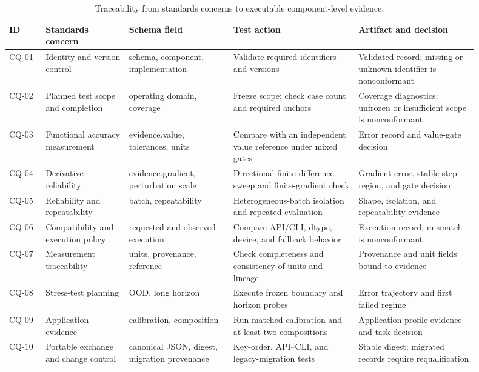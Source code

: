 \documentclass[preprint,12pt]{elsarticle}
\begin{document}
\begin{table}[htbp]
\centering
\caption{Traceability from standards concerns to executable component-level evidence.}
\label{tab:s5}
\scriptsize
\setlength{\tabcolsep}{2.5pt}
\begin{tabular}{>{\raggedright\arraybackslash}p{0.07\linewidth}>{\raggedright\arraybackslash}p{0.16\linewidth}>{\raggedright\arraybackslash}p{0.20\linewidth}>{\raggedright\arraybackslash}p{0.24\linewidth}>{\raggedright\arraybackslash}p{0.23\linewidth}}
\toprule
ID & Standards concern & Schema field & Test action & Artifact and decision\\
\midrule
CQ-01 & Identity and version control & schema, component, implementation & Validate required identifiers and versions & Validated record; missing or unknown identifier is nonconformant\\
CQ-02 & Planned test scope and completion & operating domain, coverage & Freeze scope; check case count and required anchors & Coverage diagnostics; unfrozen or insufficient scope is nonconformant\\
CQ-03 & Functional accuracy measurement & evidence.value, tolerances, units & Compare with an independent value reference under mixed gates & Error record and value-gate decision\\
CQ-04 & Derivative reliability & evidence.gradient, perturbation scale & Directional finite-difference sweep and finite-gradient check & Gradient error, stable-step region, and gate decision\\
CQ-05 & Reliability and repeatability & batch, repeatability & Heterogeneous-batch isolation and repeated evaluation & Shape, isolation, and repeatability evidence\\
CQ-06 & Compatibility and execution policy & requested and observed execution & Compare API/CLI, dtype, device, and fallback behavior & Execution record; mismatch is nonconformant\\
CQ-07 & Measurement traceability & units, provenance, reference & Check completeness and consistency of units and lineage & Provenance and unit fields bound to evidence\\
CQ-08 & Stress-test planning & OOD, long horizon & Execute frozen boundary and horizon probes & Error trajectory and first failed regime\\
CQ-09 & Application evidence & calibration, composition & Run matched calibration and at least two compositions & Application-profile evidence and task decision\\
CQ-10 & Portable exchange and change control & canonical JSON, digest, migration provenance & Key-order, API--CLI, and legacy-migration tests & Stable digest; migrated records require requalification\\
\bottomrule
\end{tabular}
\end{table}
\end{document}
